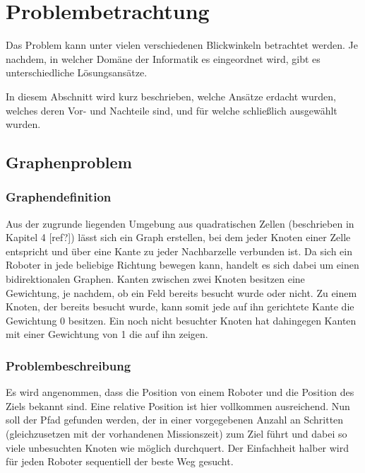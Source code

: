 \documentclass{article}
\begin{document}
\clearpage
\section{Problembetrachtung}
\label{sec:probrems}

Das Problem kann unter vielen verschiedenen Blickwinkeln betrachtet 
werden. Je nachdem, in welcher Domäne der Informatik
es eingeordnet wird, gibt es unterschiedliche Lösungsansätze.

In diesem Abschnitt wird kurz beschrieben, welche Ansätze
erdacht wurden, welches deren Vor- und Nachteile sind, und
für welche schließlich ausgewählt wurden.

\subsection{Graphenproblem}

\subsubsection{Graphendefinition}

Aus der zugrunde liegenden Umgebung aus quadratischen Zellen 
(beschrieben in Kapitel 4 [ref?]) lässt sich ein Graph erstellen, 
bei dem jeder Knoten einer Zelle entspricht und über eine Kante zu 
jeder Nachbarzelle verbunden ist. Da sich ein Roboter in jede 
beliebige Richtung bewegen kann, handelt es sich dabei um einen 
bidirektionalen Graphen. Kanten zwischen zwei Knoten besitzen 
eine Gewichtung, je nachdem, ob ein Feld bereits besucht wurde oder 
nicht. Zu einem Knoten, der bereits besucht wurde, kann somit jede 
auf ihn gerichtete Kante die Gewichtung 0 besitzen. Ein noch nicht 
besuchter Knoten hat dahingegen Kanten mit einer Gewichtung von 1 
die auf ihn zeigen.

\subsubsection{Problembeschreibung}

Es wird angenommen, dass die Position von einem Roboter und die 
Position des Ziels bekannt sind. Eine relative Position ist hier 
vollkommen ausreichend. Nun soll der Pfad gefunden werden, der 
in einer vorgegebenen Anzahl an Schritten (gleichzusetzen mit der 
vorhandenen Missionszeit) zum Ziel führt und dabei so viele 
unbesuchten Knoten wie möglich durchquert. Der Einfachheit halber
wird für jeden Roboter sequentiell der beste Weg gesucht.
\end{document}
